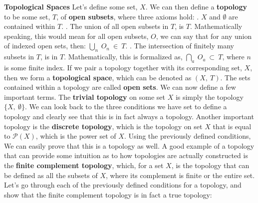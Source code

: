 \documentclass{article}
\begin{document}
\textbf{Topological Spaces} \newline \newline Let's define some set, $X$. We can then define a \textbf{topology} to be some set, $T$, of \textbf{open subsets}, where three axioms hold: \newline {}. $X$ and $\emptyset$ are contained within $T$. \newline {}. The union of all open subsets in $T$, is $T$. Mathematically speaking, this would mean for all open subsets, $O$, we can say that for any union of indexed open sets, then: $\bigcup_{n} \ O_n \ \in \ T$. \newline {}. The intersection of finitely many subsets in $T$, is in $T$. Mathematically, this is formalized as, $\bigcap_{a} \ O_a \ \subset \ T$, where $n$ is some finite index. \newline \newline If we pair a topology together with its corresponding set, $X$, then we form a \textbf{topological space}, which can be denoted as $(X, \ T)$.
\newline\newline
The sets contained within a topology are called \textbf{open sets}.
\newline\newline
We can now define a few important terms. The \textbf{trivial topology} on some set $X$ is simply the topology $\{X, \ \emptyset \}$. We can look back to the three conditions we have set to define a topology and clearly see that this is in fact always a topology. Another important topology is the \textbf{discrete topology}, which is the topology on set $X$ that is equal to $\mathcal{P}(X)$, which is the power set of $X$. Using the previously defined conditions, We can easily prove that this is a topology as well.
\newline\newline
A good example of a topology that can provide some intuition as to how topologies are actually constructed is the \textbf{finite complement topology}, which, for a set $X$, is the topology that can be defined as all the subsets of $X$, where its complement is finite or the entire set. Let's go through each of the previously defined conditions for a topology, and show that the finite complement topology is in fact a true topology:
\newline\newline
\end{document}
